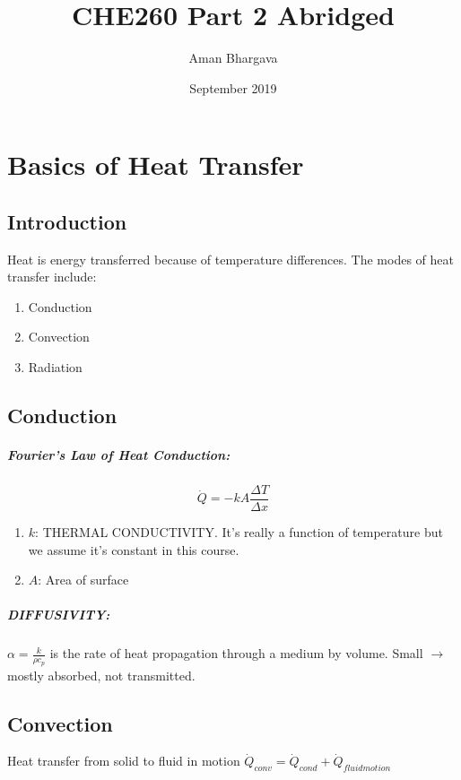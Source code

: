 \documentclass[a4paper,12pt]{report}
\begin{document}
\title{CHE260 Part 2 Abridged}
\author{Aman Bhargava}
\date{September 2019}
\maketitle

\tableofcontents

\chapter{Basics of Heat Transfer}
\section{Introduction}
Heat is energy transferred because of temperature differences. The modes of heat transfer include:
\begin{enumerate}
\item Conduction
\item Convection
\item Radiation
\end{enumerate}

\section{Conduction}
\paragraph{Fourier's Law of Heat Conduction: }
$$\dot{Q} = -kA\frac{\Delta T}{\Delta x}$$
\begin{enumerate}
\item $k$: THERMAL CONDUCTIVITY. It's really a function of temperature but we assume it's constant in this course.
\item $A$: Area of surface
\end{enumerate}

\paragraph{DIFFUSIVITY: } $\alpha = \frac{k}{\rho c_p}$ is the rate of heat propagation through a medium by volume. Small $\to$ mostly absorbed, not transmitted.

\section{Convection}
Heat transfer from solid to fluid in motion $\dot{Q}_{conv} = \dot{Q}_{cond} + \dot{Q}_{fluid motion}$
\end{document}
